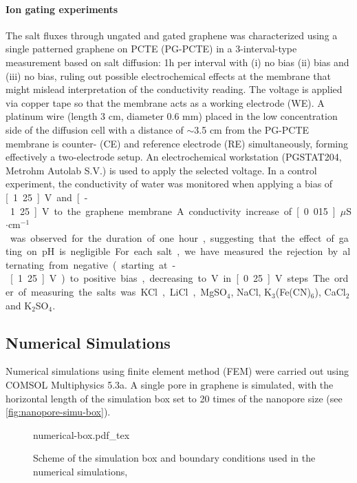 \paragraph{Ion gating experiments}
{ The salt fluxes through ungated and gated graphene
was characterized using a single patterned graphene on PCTE (PG-PCTE)} 
in a 3-interval-type measurement based on salt diffusion: 1h per interval
with (i) no bias (ii) bias and (iii) no bias, ruling out possible
electrochemical effects at the membrane that might mislead
interpretation of the conductivity reading. The voltage is applied via
copper tape so that the membrane acts as a working electrode (WE). A
platinum wire (length 3 cm, diameter 0.6 mm) placed in the low
concentration side of the diffusion cell with a distance of $\sim$3.5 cm
from the PG-PCTE membrane is counter- (CE) and reference electrode
(RE) simultaneously, forming effectively a two-electrode setup. An
electrochemical workstation (PGSTAT204, Metrohm Autolab S.V.) is used
to apply the selected voltage.
{ In a control experiment, the conductivity of water was monitored when applying a bias of \unit[1.25]{V} and \unit[-1.25]{V} to the graphene membrane. A conductivity increase of \unit[0.015]{$\mu$S$\cdot$cm$^{-1}$} was observed for the duration of one hour, suggesting that the effect of gating on pH is negligible.

  For each salt, we have measured the rejection by alternating from
  negative (starting at -\unit[1.25]{V}) to positive bias, decreasing
  to \unit[0]{V} in \unit[0.25]{V} steps. The order of measuring the
  salts was KCl, LiCl, MgSO$_4$, NaCl, K$_3$(Fe(CN)$_6$), CaCl$_2$ and
  K$_2$SO$_4$.}

\vspace{1em}
\noindent

\subsection*{Numerical Simulations}
\label{sec:np-numer-simul}

Numerical simulations using finite element method (FEM) were carried
out using COMSOL Multiphysics 5.3a. A single pore in graphene is
simulated, with the horizontal length of the simulation box set to 20
times of the nanopore size (see \autoref{fig:nanopore-simu-box}).
%
\begin{figure}[!htbp]
  \centering
  {numerical-box.pdf_tex}
  \caption{\label{fig:nanopore-simu-box} Scheme of the simulation box
    and boundary conditions used in the numerical simulations,}
\end{figure}

